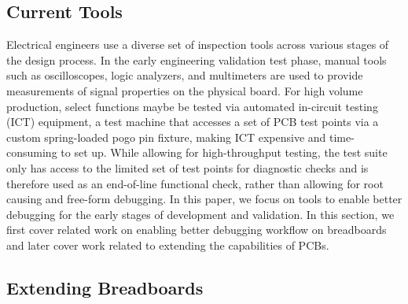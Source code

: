 \documentclass [11pt, proquest] {uwthesis}[2020/02/24]
\begin{document}
\subsection{Current Tools}

Electrical engineers use a diverse set of inspection tools across various stages of the design process. In the early engineering validation test phase, manual tools such as oscilloscopes, logic analyzers, and multimeters are used to provide measurements of signal properties on the physical board. For high volume production, select functions maybe be tested via automated in-circuit testing (ICT) equipment, a test machine that accesses a set of PCB test points via a custom spring-loaded pogo pin fixture, making ICT expensive and time-consuming to set up. While allowing for high-throughput testing, the test suite  only has access to the limited set of test points for diagnostic checks and is therefore used as an end-of-line functional check, rather than allowing for root causing and free-form debugging. In this paper, we focus on tools to enable better debugging for the early stages of development and validation. In this section, we first cover related work on enabling better debugging workflow on breadboards and later cover work related to extending the capabilities of PCBs.   


\subsection{Extending Breadboards}
\end{document}
